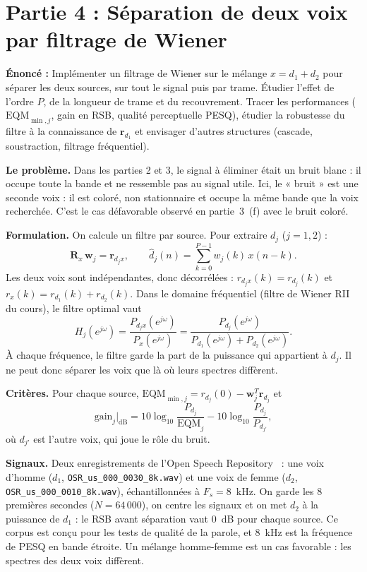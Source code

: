 \section{Partie 4 : Séparation de deux voix par filtrage de Wiener}

\begin{enonce}
\textbf{Énoncé :} Implémenter un filtrage de Wiener sur le mélange $x=d_1+d_2$ pour séparer les deux sources, sur tout le signal puis par trame. Étudier l'effet de l'ordre $P$, de la longueur de trame et du recouvrement. Tracer les performances ($\mathrm{EQM}_{\min,j}$, gain en RSB, qualité perceptuelle PESQ), étudier la robustesse du filtre à la connaissance de $\mathbf{r}_{d_1}$ et envisager d'autres structures (cascade, soustraction, filtrage fréquentiel).
\end{enonce}

\textbf{Le problème.} Dans les parties 2 et 3, le signal à éliminer était un bruit blanc : il occupe toute la bande et ne ressemble pas au signal utile. Ici, le « bruit » est une seconde voix : il est coloré, non stationnaire et occupe la même bande que la voix recherchée. C'est le cas défavorable observé en partie~3~(f) avec le bruit coloré.

\textbf{Formulation.} On calcule un filtre par source. Pour extraire $d_j$ ($j=1,2$) :
\[
\mathbf{R}_x\,\mathbf{w}_j=\mathbf{r}_{d_jx},\qquad \hat d_j(n)=\sum_{k=0}^{P-1}w_j(k)\,x(n-k).
\]
Les deux voix sont indépendantes, donc décorrélées : $r_{d_jx}(k)=r_{d_j}(k)$ et $r_x(k)=r_{d_1}(k)+r_{d_2}(k)$. Dans le domaine fréquentiel (filtre de Wiener RII du cours), le filtre optimal vaut
\[
H_j(e^{j\omega})=\frac{P_{d_jx}(e^{j\omega})}{P_x(e^{j\omega})}=\frac{P_{d_j}(e^{j\omega})}{P_{d_1}(e^{j\omega})+P_{d_2}(e^{j\omega})}.
\]
À chaque fréquence, le filtre garde la part de la puissance qui appartient à $d_j$. Il ne peut donc séparer les voix que là où leurs spectres diffèrent.

\textbf{Critères.} Pour chaque source, $\mathrm{EQM}_{\min,j}=r_{d_j}(0)-\mathbf{w}_j^T\mathbf{r}_{d_j}$ et
\[
\mathrm{gain}_j|_{\mathrm{dB}}=10\log_{10}\frac{P_{d_j}}{\mathrm{EQM}_j}-10\log_{10}\frac{P_{d_j}}{P_{d_{j'}}},
\]
où $d_{j'}$ est l'autre voix, qui joue le rôle du bruit.

\textbf{Signaux.} Deux enregistrements de l'Open Speech Repository~\cite{osr} : une voix d'homme ($d_1$, \texttt{OSR\_us\_000\_0030\_8k.wav}) et une voix de femme ($d_2$, \texttt{OSR\_us\_000\_0010\_8k.wav}), échantillonnées à $F_s=8$~kHz. On garde les $8$ premières secondes ($N=64\,000$), on centre les signaux et on met $d_2$ à la puissance de $d_1$ : le RSB avant séparation vaut $0$~dB pour chaque source. Ce corpus est conçu pour les tests de qualité de la parole, et $8$~kHz est la fréquence de PESQ en bande étroite. Un mélange homme-femme est un cas favorable : les spectres des deux voix diffèrent.

